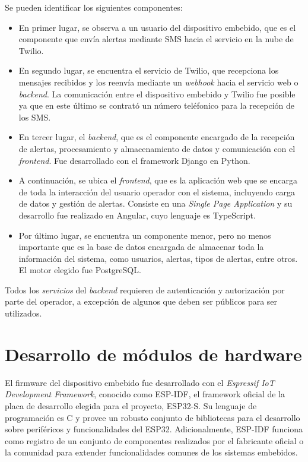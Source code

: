 Se pueden identificar los siguientes componentes:
\begin{itemize}
	\item En primer lugar, se observa a un usuario del dispositivo embebido, que es el componente que envía alertas mediante SMS hacia el servicio en la nube de Twilio.
	\item En segundo lugar, se encuentra el servicio de Twilio, que recepciona los mensajes recibidos y los reenvía mediante un \textit{webhook} hacia el servicio web o \textit{backend}. La comunicación entre el dispositivo embebido y Twilio fue posible ya que en este último se contrató un número teléfonico para la recepción de los SMS. 
	\item En tercer lugar, el \textit{backend}, que es el componente encargado de la recepción de alertas, procesamiento y almacenamiento de datos y comunicación con el \textit{frontend}. Fue desarrollado con el framework Django en Python.
	\item A continuación, se ubica el \textit{frontend}, que es la aplicación web que se encarga de toda la interacción del usuario operador con el sistema, incluyendo carga de datos y gestión de alertas. Consiste en una \textit{Single Page Application } y su desarrollo fue realizado en Angular, cuyo lenguaje es TypeScript\citep{ANGULAR:1}.
	\item Por último lugar, se encuentra un componente menor, pero no menos importante que es la base de datos encargada de almacenar toda la información del sistema, como usuarios, alertas, tipos de alertas, entre otros. El motor elegido fue PostgreSQL.
\end{itemize}

Todos los \textit{servicios} del \textit{backend} requieren de autenticación y autorización por parte del operador, a excepción de algunos que deben ser públicos para ser utilizados.
   
\section{Desarrollo de módulos de hardware}

El firmware del dispositivo embebido fue desarrollado con el \textit{Espressif IoT Development Framework}, conocido como ESP-IDF, el framework oficial de la placa de desarrollo elegida para el proyecto, ESP32-S\citep{ESPIDF:1}. Su lenguaje de programación es C y provee un robusto conjunto de bibliotecas para el desarrollo sobre periféricos y funcionalidades del ESP32. Adicionalmente, ESP-IDF funciona como registro de un conjunto de componentes realizados por el fabricante oficial o la comunidad para extender funcionalidades comunes de los sistemas embebidos. 

